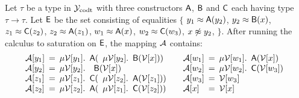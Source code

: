 \begin{example}
Let $\tau$ be a type in $\mathcal{Y}_{\mathrm{codt}}$ with three constructors $\textsf{A}$, $\textsf{B}$ and $\textsf{C}$ each having type $\tau \rightarrow \tau$.
Let $\mathsf{E}$ be the set consisting of equalities
$\{$
$y_1 \approx \textsf{A}( y_2 )$,
$y_2 \approx \textsf{B}( x )$,
$z_1 \approx \textsf{C}( z_2 )$,
$z_2 \approx \textsf{A}( z_1 )$,
$w_1 \approx \textsf{A}( x )$,
$w_2 \approx \textsf{C}( w_3 )$,
$x \not\approx y_2$,
$\}$.
After running the calculus to saturation on $\mathsf{E}$, the mapping $\mathcal{A}$ contains:
\[\begin{array}{l@{\hspace{.5em}}l@{\hspace{.5em}}l@{\hspace{.5em}}l@{\hspace{.5em}}l@{\hspace{.5em}}l@{\hspace{2.0em}}l@{\hspace{.5em}}l@{\hspace{.5em}}l@{\hspace{.5em}}l@{\hspace{.5em}}l@{\hspace{.5em}}l@{\hspace{.5em}}l}
\Val \ec{y_1} & = & \mu \Var{\ec{y_1}}. & \const{A}( & \mu \Var{\ec{y_2}}. & \const{B}( \Var{\ec{x}} ) ) &
\Val \ec{w_1} & = & \mu \Var{\ec{w_1}}. & \const{A}( \Var{\ec{x}} )      & \\ 
\Val \ec{y_2} & = & \mu \Var{\ec{y_2}}. & \multicolumn{2}{l}{\const{B}( \Var{\ec{x}} )}      & &
\Val \ec{w_2} & = & \mu \Var{\ec{w_2}}. & \const{C}( \Var{\ec{w_3}} ) \\
\Val \ec{z_1} & = & \mu \Var{\ec{z_1}}. & \const{C}( & \mu \Var{\ec{z_2}}. & \const{A}( \Var{\ec{z_1}} ) ) &
\Val \ec{w_3} & = & \Var{\ec{w_3}} \\
\Val \ec{z_2} & = & \mu \Var{\ec{z_2}}. & \const{A}( & \mu \Var{\ec{z_1}}. & \const{C}( \Var{\ec{z_2}} ) ) & 
\Val \ec{x} & = & \Var{\ec{x}} \\
\end{array}\]


\end{example}
